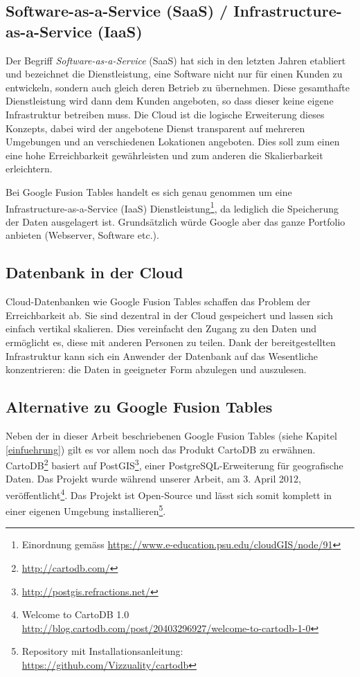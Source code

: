 \subsection{Software-as-a-Service (SaaS) / Infrastructure-as-a-Service (IaaS)}
Der Begriff \emph{Software-as-a-Service} (\gls{SaaS}) hat sich in den letzten Jahren etabliert und bezeichnet die Dienstleistung, eine Software nicht nur für einen Kunden zu entwickeln, sondern auch gleich deren Betrieb zu übernehmen. Diese gesamthafte Dienstleistung wird dann dem Kunden angeboten, so dass dieser keine eigene Infrastruktur betreiben muss. Die \gls{Cloud} ist die logische  Erweiterung dieses Konzepts, dabei wird der angebotene Dienst transparent auf mehreren Umgebungen und an verschiedenen Lokationen angeboten. Dies soll zum einen eine hohe Erreichbarkeit gewährleisten und zum anderen die Skalierbarkeit erleichtern.\cite{cloud}

Bei Google Fusion Tables handelt es sich genau genommen um eine Infrastructure-as-a-Service (IaaS) Dienstleistung\footnote{Einordnung gemäss \url{https://www.e-education.psu.edu/cloudGIS/node/91}}, da lediglich die Speicherung der Daten ausgelagert ist. Grundsätzlich würde Google aber das ganze Portfolio anbieten (Webserver,  Software etc.).

\subsection{Datenbank in der Cloud}
\gls{Cloud}-Datenbanken wie Google Fusion Tables schaffen das Problem der Erreichbarkeit ab. Sie sind dezentral in der \gls{Cloud} gespeichert und lassen sich  einfach vertikal skalieren. Dies vereinfacht den Zugang zu den Daten und ermöglicht es, diese mit anderen Personen zu teilen. Dank der bereitgestellten Infrastruktur kann sich ein Anwender der Datenbank auf das Wesentliche konzentrieren: die Daten in geeigneter Form abzulegen und auszulesen.

\subsection{Alternative zu Google Fusion Tables}
Neben der in dieser Arbeit beschriebenen Google Fusion Tables (siehe Kapitel \ref{einfuehrung}) gilt es vor allem noch das Produkt CartoDB zu erwähnen. CartoDB\footnote{\url{http://cartodb.com/}} basiert auf PostGIS\footnote{\url{http://postgis.refractions.net/}}, einer PostgreSQL-Erweiterung für geografische Daten. Das Projekt wurde während unserer Arbeit, am 3. April 2012, veröffentlicht\footnote{Welcome to CartoDB 1.0 \url{http://blog.cartodb.com/post/20403296927/welcome-to-cartodb-1-0}}. Das Projekt ist Open-Source und lässt sich somit komplett in einer eigenen Umgebung installieren\footnote{Repository mit Installationsanleitung: \url{https://github.com/Vizzuality/cartodb}}.


